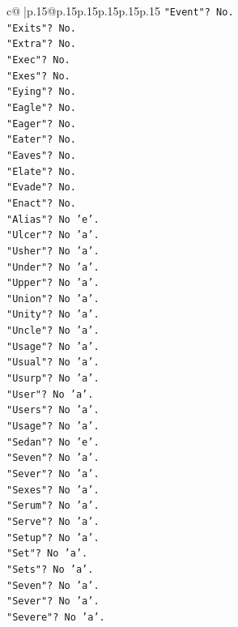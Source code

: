 \documentclass{article}
\begin{document}
{\begin{supertabular}{c@{$\;$}|p{.15\linewidth}@{}p{.15\linewidth}p{.15\linewidth}p{.15\linewidth}p{.15\linewidth}p{.15\linewidth}}
{{{\texttt{"Event"? No.} \\
\texttt{"Exits"? No.} \\
\texttt{"Extra"? No.} \\
\texttt{"Exec"? No.} \\
\texttt{"Exes"? No.} \\
\texttt{"Eying"? No.} \\
\texttt{"Eagle"? No.} \\
\texttt{"Eager"? No.} \\
\texttt{"Eater"? No.} \\
\texttt{"Eaves"? No.} \\
\texttt{"Elate"? No.} \\
\texttt{"Evade"? No.} \\
\texttt{"Enact"? No.} \\
\texttt{"Alias"? No 'e'.} \\
\texttt{"Ulcer"? No 'a'.} \\
\texttt{"Usher"? No 'a'.} \\
\texttt{"Under"? No 'a'.} \\
\texttt{"Upper"? No 'a'.} \\
\texttt{"Union"? No 'a'.} \\
\texttt{"Unity"? No 'a'.} \\
\texttt{"Uncle"? No 'a'.} \\
\texttt{"Usage"? No 'a'.} \\
\texttt{"Usual"? No 'a'.} \\
\texttt{"Usurp"? No 'a'.} \\
\texttt{"User"? No 'a'.} \\
\texttt{"Users"? No 'a'.} \\
\texttt{"Usage"? No 'a'.} \\
\texttt{"Sedan"? No 'e'.} \\
\texttt{"Seven"? No 'a'.} \\
\texttt{"Sever"? No 'a'.} \\
\texttt{"Sexes"? No 'a'.} \\
\texttt{"Serum"? No 'a'.} \\
\texttt{"Serve"? No 'a'.} \\
\texttt{"Setup"? No 'a'.} \\
\texttt{"Set"? No 'a'.} \\
\texttt{"Sets"? No 'a'.} \\
\texttt{"Seven"? No 'a'.} \\
\texttt{"Sever"? No 'a'.} \\
\texttt{"Severe"? No 'a'.} \\
}}}
\end{supertabular}}
\end{document}
